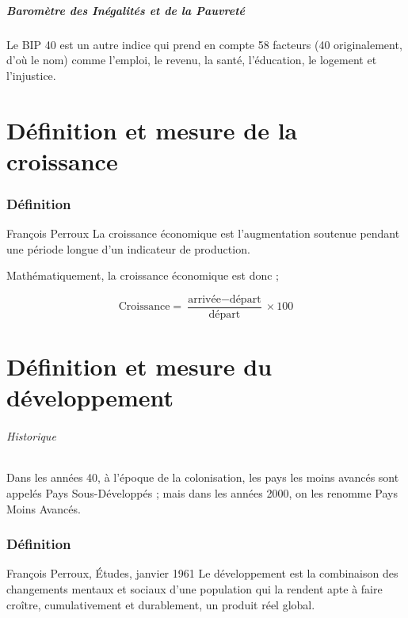 \documentclass[10pt,a4paper,french]{article}
\begin{document}
\subsubsection{Baromètre des Inégalités et de la Pauvreté}

Le BIP 40 est un autre indice qui prend en compte 58 facteurs (40 originalement, d’où le nom) comme
l’emploi, le revenu, la santé, l’éducation, le logement et l’injustice.

\part{Définition et mesure de la croissance}

\section{Définition}

\begin{cquote}{François Perroux}
La croissance économique est l’augmentation soutenue pendant une période longue d’un indicateur de production.
\end{cquote}

Mathématiquement, la croissance économique est donc ;

\[
\text{Croissance} = \frac{\text{arrivée} - \text{départ}} {\text{départ}} \times 100
\]

\part{Définition et mesure du développement}

\paragraph{Historique}

Dans les années 40, à l’époque de la colonisation, les pays les moins avancés sont appelés Pays Sous-Développés
; mais dans les années 2000, on les renomme Pays Moins Avancés.

\section{Définition}

\begin{cquote}{François Perroux, Études, janvier 1961}
Le développement est la combinaison des changements mentaux et sociaux d’une population qui la rendent apte à faire croître, cumulativement et durablement, un produit réel global.
\end{cquote}
\end{document}
